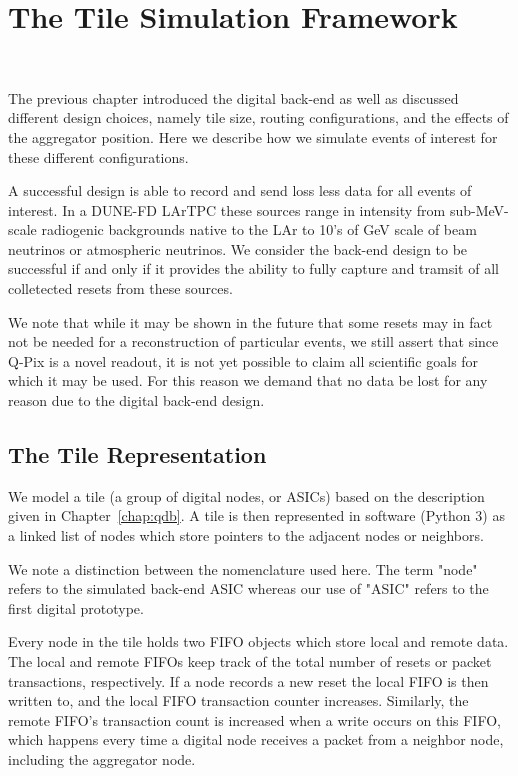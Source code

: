 \section{The Tile Simulation Framework}~\label{sec:tile_simulation}

The previous chapter introduced the digital back-end as well as discussed different design choices, namely tile size, routing configurations, and the effects of the aggregator position.
Here we describe how we simulate events of interest for these different configurations.

A successful design is able to record and send loss less data for all events of interest.
In a DUNE-FD LArTPC these sources range in intensity from sub-MeV-scale radiogenic backgrounds native to the LAr to 10's of GeV scale of beam neutrinos or atmospheric neutrinos.
We consider the back-end design to be successful if and only if it provides the ability to fully capture and tramsit of all colletected resets from these sources.

We note that while it may be shown in the future that some resets may in fact not be needed for a reconstruction of particular events, we still assert that since Q-Pix is a novel readout, it is not yet possible to claim all scientific goals for which it may be used.
For this reason we demand that no data be lost for any reason due to the digital back-end design.

\subsection{The Tile Representation}

We model a tile (a group of digital nodes, or ASICs) based on the description given in Chapter~\ref{chap:qdb}.
A tile is then represented in software (Python 3) as a linked list of nodes which store pointers to the adjacent nodes or neighbors.

We note a distinction between the nomenclature used here. 
The term "node" refers to the simulated back-end ASIC whereas our use of "ASIC" refers to the first digital prototype.

Every node in the tile holds two FIFO objects which store local and remote data. 
The local and remote FIFOs keep track of the total number of resets or packet transactions, respectively.
If a node records a new reset the local FIFO is then written to, and the local FIFO transaction counter increases.
Similarly, the remote FIFO's transaction count is increased when a write occurs on this FIFO, which happens every time a digital node receives a packet from a neighbor node, including the aggregator node.

